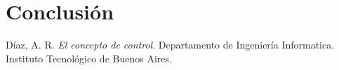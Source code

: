 \documentclass[10pt,journal,compsoc]{IEEEtran}
\begin{document}
\section{Conclusi\'on}

\begin{thebibliography}{1}

D\'iaz, A. R. \emph{El concepto de control}. Departamento de Ingenier\'ia Informatica. 
Instituto Tecnol\'ogico de Buenos Aires.
\end{thebibliography}
\end{document}
